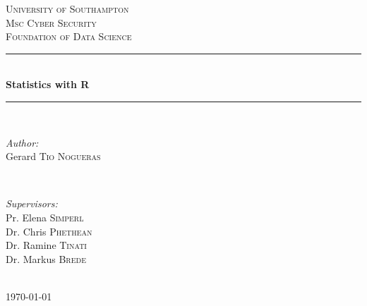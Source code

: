 \documentclass[12pt]{article} %
\begin{document}

\begin{titlepage}

\newcommand{\HRule}{\rule{\linewidth}{0.5mm}} %

\center %

\textsc{\LARGE University of Southampton}\\[1.5cm] %
\textsc{\Large Msc Cyber Security}\\[0.5cm] %
\textsc{\large Foundation of Data Science}\\[0.5cm] %

\HRule \\[0.4cm]
{ \huge \bfseries Statistics with R}\\[0.4cm] %
\HRule \\[1.5cm]

\begin{minipage}{0.4\textwidth}
\begin{flushleft} \large
\emph{Author:}\\
Gerard \textsc{Tio Nogueras} %
\end{flushleft}
\end{minipage}
~
\begin{minipage}{0.4\textwidth}
\begin{flushright} \large
\emph{Supervisors:} \\
Pr. Elena  \textsc{Simperl}\\ %
Dr. Chris \textsc{Phethean}\\
Dr. Ramine \textsc{Tinati}\\
Dr. Markus \textsc{Brede}
\end{flushright}
\end{minipage}\\[4cm]

{\large \today}\\[3cm] %


\vfill %
\end{titlepage}
\newpage
\end{document}
